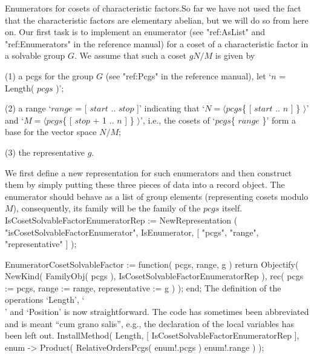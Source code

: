 {\bsf Enumerators for cosets of  characteristic factors.}\quad So far  we
have  not used the  fact that  the characteristic  factors are elementary
abelian, but we will do so from  here on. Our  first task is to implement
an enumerator (see "ref:AsList" and "ref:Enumerators"  in  the  reference
manual) for a coset of a characteristic factor in a solvable  group  $G$.
We assume that such a coset $gN/M$ is given by

\beginlist%

\item{(1)}  a pcgs for  the group  $G$ (see  "ref:Pcgs" in the  reference
  manual), let `$n$ = Length( $pcgs$ )';

\item{(2)} a range `$range$ = [ $start$  .. $stop$ ]' indicating that `$N
  =  \langle pcgs$\{ [ $start$  .. $n$ ] \} $\rangle$'  and `$M = \langle
  pcgs$\{  [  $stop$ + 1   .. $n$ ]  \} $\rangle$',  i.e.,  the cosets of
  `$pcgs$\{ $range$ \}' form a base for the vector space $N/M$;

\item{(3)} the representative $g$.

\endlist

We   first  define a  new representation  for   such enumerators and then
construct them by simply putting these three pieces of data into a record
object. The  enumerator  should  behave as  a   list of  group   elements
(representing cosets modulo $M$),   consequently, its family will  be the
family of the $pcgs$ itself.
\begintt
IsCosetSolvableFactorEnumeratorRep := NewRepresentation
    ( "isCosetSolvableFactorEnumerator", IsEnumerator,
                                [ "pcgs", "range", "representative" ] );

EnumeratorCosetSolvableFactor := function( pcgs, range, g )
    return Objectify( NewKind( FamilyObj( pcgs ),
                   IsCosetSolvableFactorEnumeratorRep ),
                   rec( pcgs := pcgs,
                       range := range,
              representative := g ) );
end;
\endtt
The definition of the operations `Length', `\\[\\]' and `Position' is now
straightforward. The  code has sometimes  been  abbreviated and is  meant
``cum grano salis'',  e.g.,  the declaration of  the local  variables has
been left out.
\begintt
InstallMethod( Length, [ IsCosetSolvableFactorEnumeratorRep ],
    enum -> Product( RelativeOrdersPcgs( enum!.pcgs ){ enum!.range } ) );
\endtt

